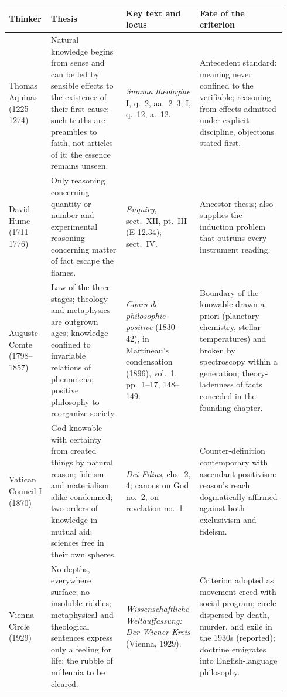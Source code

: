 \begin{longtable}{>{\raggedright\arraybackslash}p{0.135\linewidth}>{\raggedright\arraybackslash}p{0.265\linewidth}>{\raggedright\arraybackslash}p{0.24\linewidth}>{\raggedright\arraybackslash}p{0.30\linewidth}}
\toprule
\textbf{Thinker} & \textbf{Thesis} & \textbf{Key text and locus} & \textbf{Fate of the criterion}\\
\midrule
\endhead
\bottomrule
\endfoot
Thomas Aquinas (1225--1274) & Natural knowledge begins from sense and can be led by sensible effects to the existence of their first cause; such truths are preambles to faith, not articles of it; the essence remains unseen. & \emph{Summa theologiae} I, q.~2, aa.~2--3; I, q.~12, a.~12. & Antecedent standard: meaning never confined to the verifiable; reasoning from effects admitted under explicit discipline, objections stated first.\\
David Hume (1711--1776) & Only reasoning concerning quantity or number and experimental reasoning concerning matter of fact escape the flames. & \emph{Enquiry}, sect.~XII, pt.~III (E 12.34); sect.~IV. & Ancestor thesis; also supplies the induction problem that outruns every instrument reading.\\
Auguste Comte (1798--1857) & Law of the three stages; theology and metaphysics are outgrown ages; knowledge confined to invariable relations of phenomena; positive philosophy to reorganize society. & \emph{Cours de philosophie positive} (1830--42), in Martineau's condensation (1896), vol.~1, pp.~1--17, 148--149. & Boundary of the knowable drawn a priori (planetary chemistry, stellar temperatures) and broken by spectroscopy within a generation; theory-ladenness of facts conceded in the founding chapter.\\
Vatican Council I (1870) & God knowable with certainty from created things by natural reason; fideism and materialism alike condemned; two orders of knowledge in mutual aid; sciences free in their own spheres. & \emph{Dei Filius}, chs.~2, 4; canons on God no.~2, on revelation no.~1. & Counter-definition contemporary with ascendant positivism: reason's reach dogmatically affirmed against both exclusivism and fideism.\\
Vienna Circle (1929) & No depths, everywhere surface; no insoluble riddles; metaphysical and theological sentences express only a feeling for life; the rubble of millennia to be cleared. & \emph{Wissenschaftliche Weltauffassung: Der Wiener Kreis} (Vienna, 1929). & Criterion adopted as movement creed with social program; circle dispersed by death, murder, and exile in the 1930s (reported); doctrine emigrates into English-language philosophy.\\

\end{longtable}
